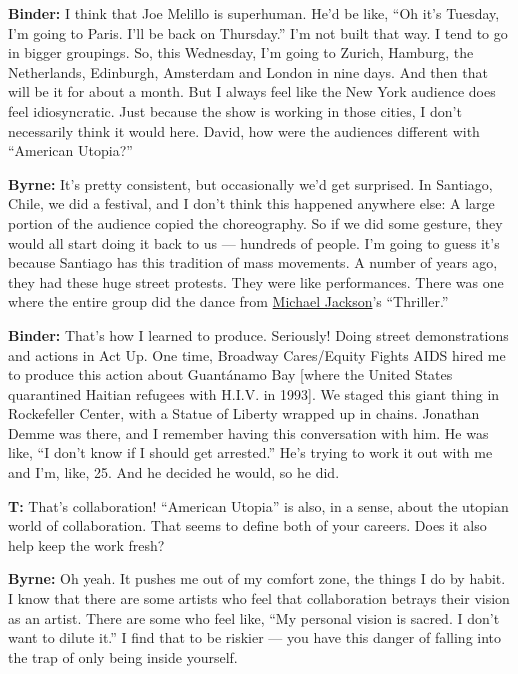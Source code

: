\textbf{Binder:} I think that Joe Melillo is superhuman. He'd be like,
``Oh it's Tuesday, I'm going to Paris. I'll be back on Thursday.'' I'm
not built that way. I tend to go in bigger groupings. So, this
Wednesday, I'm going to Zurich, Hamburg, the Netherlands, Edinburgh,
Amsterdam and London in nine days. And then that will be it for about a
month. But I always feel like the New York audience does feel
idiosyncratic. Just because the show is working in those cities, I don't
necessarily think it would here. David, how were the audiences different
with ``American Utopia?''

\textbf{Byrne:} It's pretty consistent, but occasionally we'd get
surprised. In Santiago, Chile, we did a festival, and I don't think this
happened anywhere else: A large portion of the audience copied the
choreography. So if we did some gesture, they would all start doing it
back to us --- hundreds of people. I'm going to guess it's because
Santiago has this tradition of mass movements. A number of years ago,
they had these huge street protests. They were like performances. There
was one where the entire group did the dance from
\href{https://www.nytimes3xbfgragh.onion/topic/person/michael-jackson}{Michael
Jackson}'s ``Thriller.''

\textbf{Binder:} That's how I learned to produce. Seriously! Doing
street demonstrations and actions in Act Up. One time, Broadway
Cares/Equity Fights AIDS hired me to produce this action about
Guantánamo Bay {[}where the United States quarantined Haitian refugees
with H.I.V. in 1993{]}. We staged this giant thing in Rockefeller
Center, with a Statue of Liberty wrapped up in chains. Jonathan Demme
was there, and I remember having this conversation with him. He was
like, ``I don't know if I should get arrested.'' He's trying to work it
out with me and I'm, like, 25. And he decided he would, so he did.

\textbf{T:} That's collaboration! ``American Utopia'' is also, in a
sense, about the utopian world of collaboration. That seems to define
both of your careers. Does it also help keep the work fresh?

\textbf{Byrne:} Oh yeah. It pushes me out of my comfort zone, the things
I do by habit. I know that there are some artists who feel that
collaboration betrays their vision as an artist. There are some who feel
like, ``My personal vision is sacred. I don't want to dilute it.'' I
find that to be riskier --- you have this danger of falling into the
trap of only being inside yourself.

